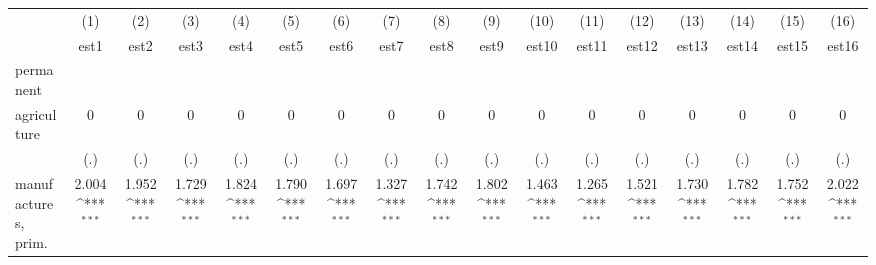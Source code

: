 {
\def\sym#1{\ifmmode^{#1}\else\(^{#1}\)\fi}
\begin{tabular}{l*{16}{c}}
\hline\hline
                    &\multicolumn{1}{c}{(1)}&\multicolumn{1}{c}{(2)}&\multicolumn{1}{c}{(3)}&\multicolumn{1}{c}{(4)}&\multicolumn{1}{c}{(5)}&\multicolumn{1}{c}{(6)}&\multicolumn{1}{c}{(7)}&\multicolumn{1}{c}{(8)}&\multicolumn{1}{c}{(9)}&\multicolumn{1}{c}{(10)}&\multicolumn{1}{c}{(11)}&\multicolumn{1}{c}{(12)}&\multicolumn{1}{c}{(13)}&\multicolumn{1}{c}{(14)}&\multicolumn{1}{c}{(15)}&\multicolumn{1}{c}{(16)}\\
                    &\multicolumn{1}{c}{est1}&\multicolumn{1}{c}{est2}&\multicolumn{1}{c}{est3}&\multicolumn{1}{c}{est4}&\multicolumn{1}{c}{est5}&\multicolumn{1}{c}{est6}&\multicolumn{1}{c}{est7}&\multicolumn{1}{c}{est8}&\multicolumn{1}{c}{est9}&\multicolumn{1}{c}{est10}&\multicolumn{1}{c}{est11}&\multicolumn{1}{c}{est12}&\multicolumn{1}{c}{est13}&\multicolumn{1}{c}{est14}&\multicolumn{1}{c}{est15}&\multicolumn{1}{c}{est16}\\
\hline
permanent           &                     &                     &                     &                     &                     &                     &                     &                     &                     &                     &                     &                     &                     &                     &                     &                     \\
agriculture         &           0         &           0         &           0         &           0         &           0         &           0         &           0         &           0         &           0         &           0         &           0         &           0         &           0         &           0         &           0         &           0         \\
                    &         (.)         &         (.)         &         (.)         &         (.)         &         (.)         &         (.)         &         (.)         &         (.)         &         (.)         &         (.)         &         (.)         &         (.)         &         (.)         &         (.)         &         (.)         &         (.)         \\
[1em]
manufactures, prim. &       2.004\sym{***}&       1.952\sym{***}&       1.729\sym{***}&       1.824\sym{***}&       1.790\sym{***}&       1.697\sym{***}&       1.327\sym{***}&       1.742\sym{***}&       1.802\sym{***}&       1.463\sym{***}&       1.265\sym{***}&       1.521\sym{***}&       1.730\sym{***}&       1.782\sym{***}&       1.752\sym{***}&       2.022\sym{***}\\

\end{tabular}}
